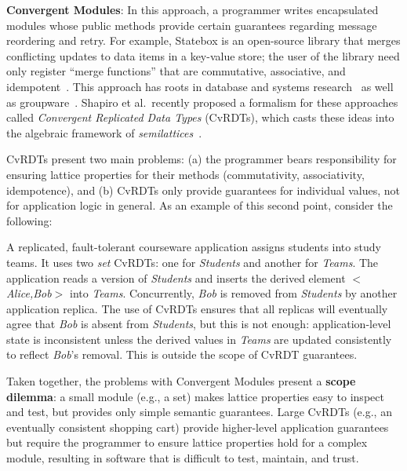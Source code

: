 \vspace{0.5em}\noindent
\textbf{Convergent Modules}: In this approach, a programmer writes encapsulated
modules whose public methods provide certain guarantees regarding message
reordering and retry. For example, Statebox is an open-source library that
merges conflicting updates to data items in a key-value store; the user of the
library need only register ``merge functions'' that are commutative,
associative, and idempotent~\cite{statebox}. This approach has roots in database
and systems research~\cite{Farrag1989,Garcia-Molina1983,Helland2009,O'Neil1986,Terry1995} as
well as groupware~\cite{Ellis1989,Sun1998}.  Shapiro et al.\ recently proposed a
formalism for these approaches called \emph{Convergent Replicated Data Types}
(CvRDTs), which casts these ideas into the algebraic framework of
\emph{semilattices}~\cite{Shapiro2011a,Shapiro2011b}.

CvRDTs present two main problems: (a) the programmer bears responsibility for
ensuring lattice properties for their methods (commutativity, associativity,
idempotence), and (b) CvRDTs only provide guarantees for individual values, not
for application logic in general. As an example of this second point, consider
the following:

\vspace{-0.25em}
\begin{example}
  \label{ex:crdt-scope-dilemma}
  A replicated, fault-tolerant courseware application assigns students into
  study teams.  It uses two \emph{set} CvRDTs: one for \emph{Students} and
  another for \emph{Teams}.  The application reads a version of \emph{Students}
  and inserts the derived element $<$\emph{Alice,Bob}$>$ into
  \emph{Teams}. Concurrently, \emph{Bob} is removed from \emph{Students} by
  another application replica. The use of CvRDTs ensures that all replicas will
  eventually agree that \emph{Bob} is absent from \emph{Students}, but this is
  not enough: application-level state is inconsistent unless the derived values
  in \emph{Teams} are updated consistently to reflect \emph{Bob}'s removal.
  This is outside the scope of CvRDT guarantees.
\end{example}

\vspace{-.25em}
Taken together, the problems with Convergent Modules present a {\bf scope
  dilemma}: a small module (e.g., a set) makes lattice properties easy to
inspect and test, but provides only simple semantic guarantees. Large CvRDTs
(e.g., an eventually consistent shopping cart) provide higher-level application
guarantees but require the programmer to ensure lattice properties hold for a
complex module, resulting in software that is difficult to test, maintain, and
trust.
% 

